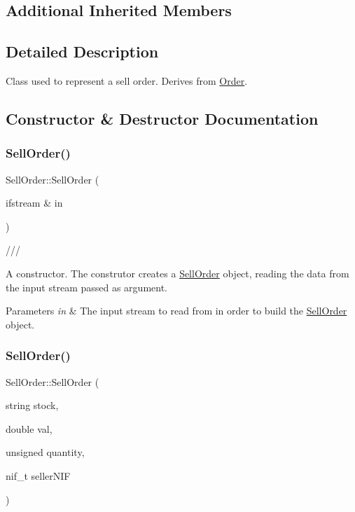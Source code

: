 \subsection*{Additional Inherited Members}


\subsection{Detailed Description}
Class used to represent a sell order. Derives from \hyperlink{class_order}{Order}. 

\subsection{Constructor \& Destructor Documentation}
\mbox{\label{class_sell_order_ac89fdde112f2f9aac52633a2d9507bea}} 
\subsubsection{\texorpdfstring{Sell\+Order()}{SellOrder()}\hspace{0.1cm}{\footnotesize\ttfamily [1/2]}}
{\footnotesize\ttfamily Sell\+Order\+::\+Sell\+Order (\begin{DoxyParamCaption}\item[{ifstream \&}]{in }\end{DoxyParamCaption})}



/// 

A constructor. The construtor creates a \hyperlink{class_sell_order}{Sell\+Order} object, reading the data from the input stream passed as argument. 
\begin{DoxyParams}{Parameters}
{\em in} & The input stream to read from in order to build the \hyperlink{class_sell_order}{Sell\+Order} object. \\
\hline
\end{DoxyParams}
\mbox{\label{class_sell_order_a19145616a9cceec182bdcb00816b89c5}} 
\subsubsection{\texorpdfstring{Sell\+Order()}{SellOrder()}\hspace{0.1cm}{\footnotesize\ttfamily [2/2]}}
{\footnotesize\ttfamily Sell\+Order\+::\+Sell\+Order (\begin{DoxyParamCaption}\item[{string}]{stock,  }\item[{double}]{val,  }\item[{unsigned}]{quantity,  }\item[{nif\+\_\+t}]{seller\+N\+IF }\end{DoxyParamCaption})}

